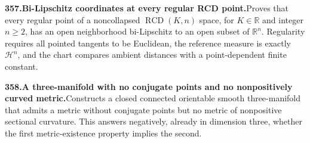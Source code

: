 \documentclass[11pt,a4paper]{article}
\begin{document}
  \par \begin{minipage}{\linewidth}
  \fontsize{10.5}{12.6}\selectfont\RaggedRight
  \hypertarget{result 357}{}
  {\bfseries\textcolor{muted}{357.}\enspace Bi-Lipschitz coordinates at every regular RCD point.}\enspace Proves that every regular point of a noncollapsed $\operatorname{RCD}(K,n)$ space, for $K\in\mathbb R$ and integer $n\ge2$, has an open neighborhood bi-Lipschitz to an open subset of $\mathbb R^n$. Regularity requires all pointed tangents to be Euclidean, the reference measure is exactly $\mathcal H^n$, and the chart compares ambient distances with a point-dependent finite constant.\par
  \end{minipage}\par\vspace{5pt}



  \par \begin{minipage}{\linewidth}
  \fontsize{10.5}{12.6}\selectfont\RaggedRight
  \hypertarget{result 358}{}
  {\bfseries\textcolor{muted}{358.}\enspace A three-manifold with no conjugate points and no nonpositively curved metric.}\enspace Constructs a closed connected orientable smooth three-manifold that admits a metric without conjugate points but no metric of nonpositive sectional curvature. This answers negatively, already in dimension three, whether the first metric-existence property implies the second.\par
  \end{minipage}\par\vspace{5pt}
\end{document}
